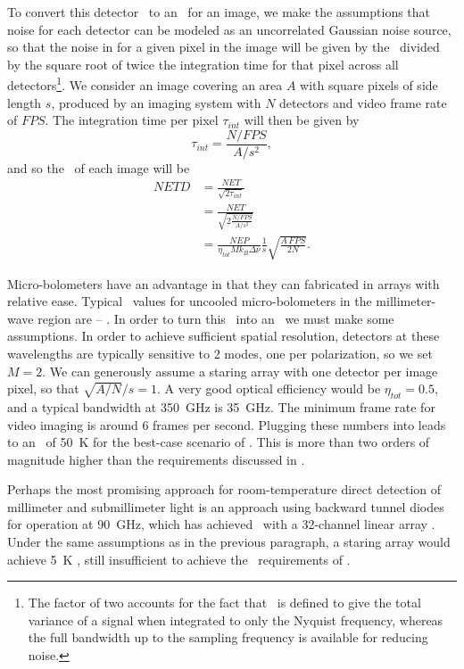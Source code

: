 To convert this detector \NET\ to an \NETD\ for an image, we make the assumptions that noise for each detector can be modeled as an uncorrelated Gaussian noise source, so that the noise in for a given pixel in the image will be given by the \NET\ divided by the square root of twice the integration time for that pixel across all detectors\footnote{%
  The factor of two accounts for the fact that \NEP\ is defined to give the total variance of a signal when integrated to only the Nyquist frequency, whereas the full bandwidth up to the sampling frequency is available for reducing noise.
}. 
We consider an image covering an area $A$ with square pixels of side length $s$, produced by an imaging system with $N$ detectors and video frame rate of $FPS$.
The integration time per pixel $\tau_{int}$ will then be given by
\begin{equation}
  \tau_{int} = \frac{N / FPS}{A / s^2},
\end{equation}
and so the \NETD\ of each image will be
\begin{align}
  NETD & = \frac{NET}{\sqrt{2\tau_{int}}} \\
       & = \frac{NET}{\sqrt{ 2 \frac{N / FPS}{A / s^2}}} \\
       & = \frac{NEP}{\eta_{tot} M k_B \Delta \nu} \frac{1}{s} \sqrt{\frac{A\,FPS}{2 N}} .
       \label{eqn:ch1-netd-defn}
\end{align}

Micro-bolometers have an advantage in that they can fabricated in arrays with relative ease.
Typical \NEP\ values for uncooled micro-bolometers in the millimeter-wave region are -- \cite{nemarich_microbolometer_2005,rogalski_terahertz_2011}.
In order to turn this \NEP\ into an \NETD\ we must make some assumptions.
In order to achieve sufficient spatial resolution, detectors at these wavelengths are typically sensitive to 2 modes, one per polarization, so we set $M = 2$.
We can generously assume a staring array with one detector per image pixel, so that $\sqrt{A/N}/s = 1$.
A very good optical efficiency would be $\eta_{tot} = 0.5$, and a typical bandwidth at \SI{350}{\GHz} is \SI{35}{\GHz}.
The minimum frame rate for video imaging is around 6 frames per second.
Plugging these numbers into  leads to an \NETD\ of \SI{50}{\K} for the best-case scenario of  \NEP.
This is more than two orders of magnitude higher than the requirements discussed in .

Perhaps the most promising approach for room-temperature direct detection of millimeter and submillimeter light is an approach using backward tunnel diodes for operation at \SI{90}{\GHz}, which has achieved  \NEP\ with a 32-channel linear array \cite{schaffner_wideband_2008,wikner_demonstration_2009}.
Under the same assumptions as in the previous paragraph, a staring array would achieve \SI{5}{\K} \NETD, still insufficient to achieve the \NETD\ requirements of .

